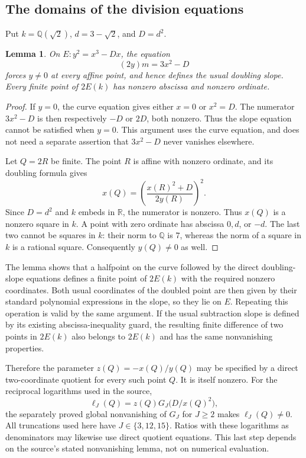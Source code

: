 \documentclass[11pt]{article}
\newtheorem{lemma}[theorem]{Lemma}
\theoremstyle{definition}
\begin{document}
\subsection{The domains of the division equations}
\label{subsec:direct-field-quotients}
Put $k=\mathbb Q(\sqrt2)$, $d=3-\sqrt2$, and $D=d^2$.
\begin{lemma}\label{lem:doubling-quotient-domain}
On $E:y^2=x^3-Dx$, the equation
\[
                           (2y)m=3x^2-D
\]
forces $y\ne0$ at every affine point, and hence defines the usual
doubling slope.  Every finite point of $2E(k)$ has nonzero abscissa
and nonzero ordinate.
\end{lemma}
\begin{proof}
If $y=0$, the curve equation gives either $x=0$ or $x^2=D$.
The numerator $3x^2-D$ is then respectively $-D$ or $2D$,
both nonzero.  Thus the slope equation cannot be satisfied when
$y=0$.  This argument uses the curve equation, and does not need
a separate assertion that $3x^2-D$ never vanishes elsewhere.

Let $Q=2R$ be finite.  The point $R$ is affine with nonzero
ordinate, and its doubling formula gives
\[
                  x(Q)=\left(\frac{x(R)^2+D}{2y(R)}\right)^2.
\]
Since $D=d^2$ and $k$ embeds in $\mathbb R$, the numerator is
nonzero.  Thus $x(Q)$ is a nonzero square in $k$.  A point with
zero ordinate has abscissa $0,d$, or $-d$.  The last two cannot
be squares in $k$: their norm to $\mathbb Q$ is $7$, whereas
the norm of a square in $k$ is a rational square.  Consequently
$y(Q)\ne0$ as well.
\end{proof}

The lemma shows that a halfpoint on the curve followed by the direct
doubling-slope equations defines a finite point of $2E(k)$ with the
required nonzero coordinates.  Both usual coordinates of the doubled
point are then given by their standard polynomial expressions in the
slope, so they lie on $E$.  Repeating this operation is valid by the
same argument.  If the usual subtraction slope is defined by its
existing abscissa-inequality guard, the resulting finite difference
of two points in $2E(k)$ also belongs to $2E(k)$ and has the same
nonvanishing properties.

Therefore the parameter $z(Q)=-x(Q)/y(Q)$ may be specified by a
direct two-coordinate quotient for every such point $Q$.  It is
itself nonzero.  For the reciprocal logarithms used in the source,
\[
              \ell_J(Q)=z(Q)G_J\bigl(D/x(Q)^2\bigr),
\]
the separately proved global nonvanishing of $G_J$ for $J\ge2$
makes $\ell_J(Q)\ne0$.  All truncations used here have
$J\in\{3,12,15\}$.  Ratios with these logarithms as denominators
may likewise use direct quotient equations.  This last step depends
on the source's stated nonvanishing lemma, not on numerical evaluation.
\end{document}
